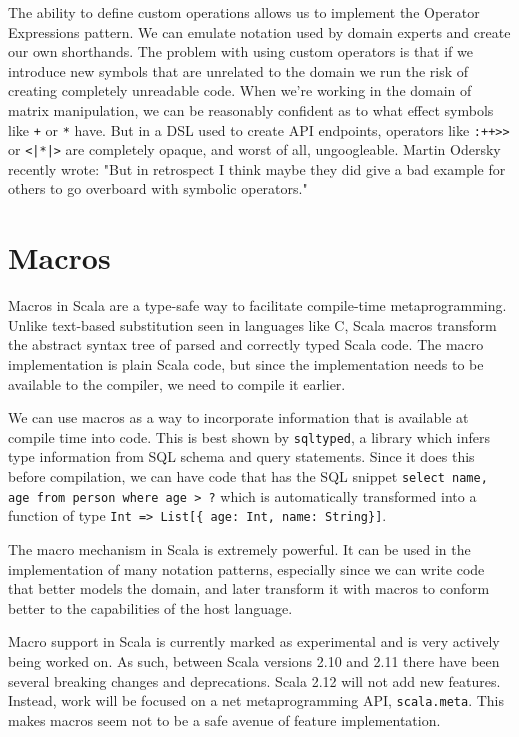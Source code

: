 The ability to define custom operations allows us to implement the Operator Expressions pattern. We can emulate notation used by domain experts and create our own shorthands. The problem with using custom operators is that if we introduce new symbols that are unrelated to the domain we run the risk of creating completely unreadable code. When we're working in the domain of matrix manipulation, we can be reasonably confident as to what effect symbols like \texttt{+} or \texttt{*} have. But in a DSL used to create API endpoints, operators like \texttt{:++>>} or \texttt{<|*|>} are completely opaque, and worst of all, ungoogleable. Martin Odersky recently wrote: "But in retrospect I think maybe they did give a bad example for others to go overboard with symbolic operators." \autocite{Odersky:2016}


\section{Macros}

Macros in Scala are a type-safe way to facilitate compile-time metaprogramming. Unlike text-based substitution seen in languages like C, Scala macros transform the abstract syntax tree of parsed and correctly typed Scala code. The macro implementation is plain Scala code, but since the implementation needs to be available to the compiler, we need to compile it earlier.

We can use macros as a way to incorporate information that is available at compile time into code. This is best shown by \texttt{sqltyped}, a library which infers type information from SQL schema and query statements. Since it does this before compilation, we can have code that has the SQL snippet \texttt{select name, age from person where age > ?} which is automatically transformed into a function of type \texttt{Int => List[\{ age: Int, name: String\}]}.

The macro mechanism in Scala is extremely powerful. It can be used in the implementation of many notation patterns, especially since we can write code that better models the domain, and later transform it with macros to conform better to the capabilities of the host language.

Macro support in Scala is currently marked as experimental and is very actively being worked on. As such, between Scala versions 2.10 and 2.11 there have been several breaking changes and deprecations. Scala 2.12 will not add new features. Instead, work will be focused on a net metaprogramming API, \texttt{scala.meta}. This makes macros seem not to be a safe avenue of feature implementation.

